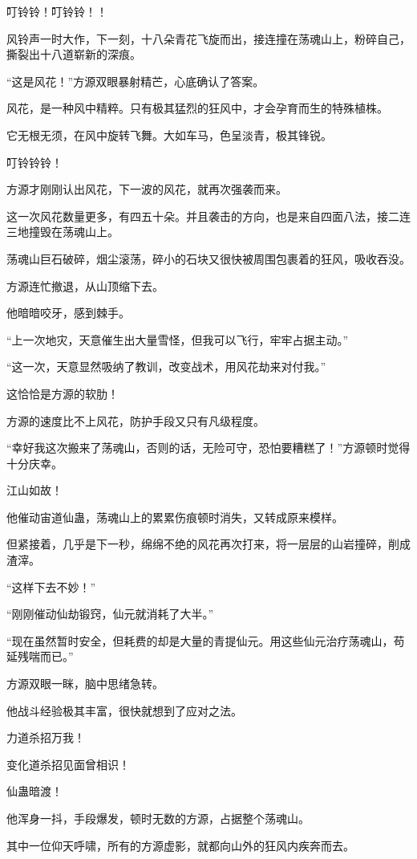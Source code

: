 \begin{this_body}
叮铃铃！叮铃铃！！

风铃声一时大作，下一刻，十八朵青花飞旋而出，接连撞在荡魂山上，粉碎自己，撕裂出十八道崭新的深痕。

“这是风花！”方源双眼暴射精芒，心底确认了答案。

风花，是一种风中精粹。只有极其猛烈的狂风中，才会孕育而生的特殊植株。

它无根无须，在风中旋转飞舞。大如车马，色呈淡青，极其锋锐。

叮铃铃铃！

方源才刚刚认出风花，下一波的风花，就再次强袭而来。

这一次风花数量更多，有四五十朵。并且袭击的方向，也是来自四面八法，接二连三地撞毁在荡魂山上。

荡魂山巨石破碎，烟尘滚荡，碎小的石块又很快被周围包裹着的狂风，吸收吞没。

方源连忙撤退，从山顶缩下去。

他暗暗咬牙，感到棘手。

“上一次地灾，天意催生出大量雪怪，但我可以飞行，牢牢占据主动。”

“这一次，天意显然吸纳了教训，改变战术，用风花劫来对付我。”

这恰恰是方源的软肋！

方源的速度比不上风花，防护手段又只有凡级程度。

“幸好我这次搬来了荡魂山，否则的话，无险可守，恐怕要糟糕了！”方源顿时觉得十分庆幸。

江山如故！

他催动宙道仙蛊，荡魂山上的累累伤痕顿时消失，又转成原来模样。

但紧接着，几乎是下一秒，绵绵不绝的风花再次打来，将一层层的山岩撞碎，削成渣滓。

“这样下去不妙！”

“刚刚催动仙劫锻窍，仙元就消耗了大半。”

“现在虽然暂时安全，但耗费的却是大量的青提仙元。用这些仙元治疗荡魂山，苟延残喘而已。”

方源双眼一眯，脑中思绪急转。

他战斗经验极其丰富，很快就想到了应对之法。

力道杀招万我！

变化道杀招见面曾相识！

仙蛊暗渡！

他浑身一抖，手段爆发，顿时无数的方源，占据整个荡魂山。

其中一位仰天呼啸，所有的方源虚影，就都向山外的狂风内疾奔而去。


\end{this_body}
